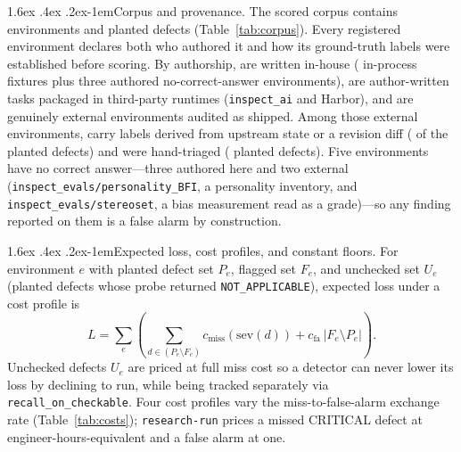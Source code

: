 \documentclass[11pt]{article}
\makeatletter
\renewcommand\paragraph{\@startsection{paragraph}{4}{\z@}%
  {1.6ex \@plus .4ex \@minus .2ex}{-1em}{\normalfont\normalsize\bfseries}}
\newcommand{\assay}{\textsc{Assay}}
\makeatother
\begin{document}
\paragraph{Corpus and provenance.} The scored corpus contains \nEnv{} environments and \nPlanted{}
planted defects (Table~\ref{tab:corpus}). Every registered environment declares both who authored it
and how its ground-truth labels were established before scoring. By authorship, \nAuthored{} are
written in-house (\nFixtures{} in-process fixtures plus three authored no-correct-answer
environments), \nThirdFormat{} are author-written tasks packaged in third-party runtimes
(\texttt{inspect\_ai} and Harbor), and \nExternal{} are genuinely external environments audited as
shipped. Among those \nExternal{} external environments, \nExtDerived{} carry labels derived from
upstream state or a revision diff (\nPlantedExtDerived{} of the \nPlanted{} planted defects) and
\nExtHand{} were hand-triaged (\nPlantedHand{} planted defects). Five environments have no correct
answer---three authored here and two external (\texttt{inspect\_evals/personality\_BFI}, a
personality inventory, and \texttt{inspect\_evals/stereoset}, a bias measurement read as a
grade)---so any finding reported on them is a false alarm by construction.

\begin{table}[t]\centering\footnotesize

\caption{Corpus composition by authorship provenance, label source, and ecosystem. Clean
environments carry zero planted defects; spurious counts are \assay{}'s deterministic false alarms.}
\label{tab:corpus}
\end{table}

\paragraph{Expected loss, cost profiles, and constant floors.} For environment $e$ with planted
defect set $P_e$, flagged set $F_e$, and unchecked set $U_e$ (planted defects whose probe returned
\texttt{NOT\_APPLICABLE}), expected loss under a cost profile is
\[
L = \sum_e \left(\sum_{d \in (P_e \setminus F_e)} c_{\text{miss}}(\mathrm{sev}(d)) + c_{\text{fa}}\,|F_e \setminus P_e|\right).
\]
Unchecked defects $U_e$ are priced at full miss cost so a detector can never lower its loss by
declining to run, while being tracked separately via \texttt{recall\_on\_checkable}. Four cost
profiles vary the miss-to-false-alarm exchange rate (Table~\ref{tab:costs}); \texttt{research-run}
prices a missed CRITICAL defect at \critShipped{} engineer-hours-equivalent and a false alarm at one.
\end{document}
